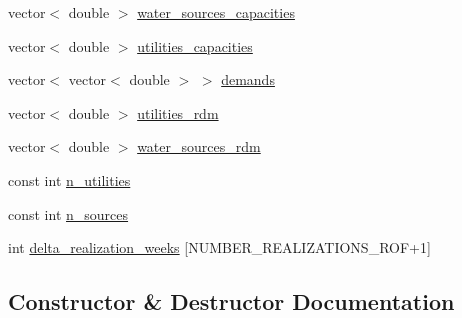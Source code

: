 \begin{DoxyCompactItemize}
vector$<$ double $>$ \mbox{\hyperlink{classContinuityModel_aadc8d46b2d0cc0a5c6b5ccdf0c5c24d4}{water\+\_\+sources\+\_\+capacities}}
\item 
vector$<$ double $>$ \mbox{\hyperlink{classContinuityModel_a781786effdf14fefcb2201eb33d9e0c7}{utilities\+\_\+capacities}}
\item 
vector$<$ vector$<$ double $>$ $>$ \mbox{\hyperlink{classContinuityModel_a1994ed4d99e0583eac5c82a4b26d9728}{demands}}
\item 
vector$<$ double $>$ \mbox{\hyperlink{classContinuityModel_aa4a00b76da6295d2faa11e3dcaea1896}{utilities\+\_\+rdm}}
\item 
vector$<$ double $>$ \mbox{\hyperlink{classContinuityModel_ab7b8fa93a6f56b328e425e1ead6cfefa}{water\+\_\+sources\+\_\+rdm}}
\item 
const int \mbox{\hyperlink{classContinuityModel_a6df6198ebc99a099df08f4b8ce6b52b9}{n\+\_\+utilities}}
\item 
const int \mbox{\hyperlink{classContinuityModel_a3c25a0d17579eb0fdad0b18319441460}{n\+\_\+sources}}
\item 
int \mbox{\hyperlink{classContinuityModel_aee4088e422a0d3723dc7895c96c9ebe3}{delta\+\_\+realization\+\_\+weeks}} \mbox{[}N\+U\+M\+B\+E\+R\+\_\+\+R\+E\+A\+L\+I\+Z\+A\+T\+I\+O\+N\+S\+\_\+\+R\+OF+1\mbox{]}
\end{DoxyCompactItemize}


\subsection{Constructor \& Destructor Documentation}
\mbox{\label{classContinuityModel_acadf595deb924bc08c9b702adf223365}} 
